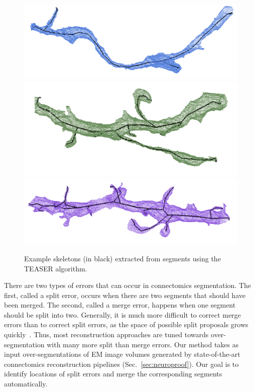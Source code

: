 \begin{figure}[t]
	\centering
	\includegraphics[width=0.92\linewidth]{./figures/skeleton1.png}
	\includegraphics[width=0.92\linewidth]{./figures/skeleton2.png}
	\includegraphics[width=0.92\linewidth]{./figures/skeleton3.png}
	\caption{Example skeletons (in black) extracted from segments using the TEASER algorithm.}
	\label{fig:skeletonization}
\end{figure}

There are two types of errors that can occur in connectomics segmentation.
The first, called a split error, occurs when there are two segments that should have been merged. The second, called a merge error, happens when one segment should be split into two. Generally, it is much more difficult to correct merge errors than to correct split errors,
as the space of possible split proposals grows quickly~\cite{parag2015properties}.
Thus, most reconstruction approaches are tuned towards over-segmentation with many more split than merge errors. Our method takes as input over-segmentations of EM image volumes generated by state-of-the-art connectomics reconstruction pipelines (Sec.~\ref{sec:neuroproof}). Our goal is to identify locations of split errors and merge the corresponding segments automatically.

